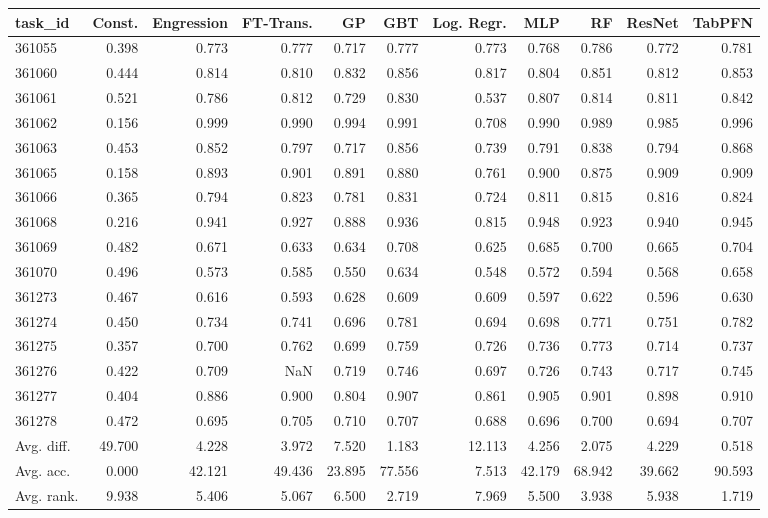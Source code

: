 \begin{tabular}{lrrrrrrrrrr}
\toprule
task\_id & Const. & Engression & FT-Trans. & GP & GBT & Log. Regr. & MLP & RF & ResNet & TabPFN \\
\midrule
361055 & 0.398 & 0.773 & 0.777 & 0.717 & 0.777 & 0.773 & 0.768 & 0.786 & 0.772 & 0.781 \\
361060 & 0.444 & 0.814 & 0.810 & 0.832 & 0.856 & 0.817 & 0.804 & 0.851 & 0.812 & 0.853 \\
361061 & 0.521 & 0.786 & 0.812 & 0.729 & 0.830 & 0.537 & 0.807 & 0.814 & 0.811 & 0.842 \\
361062 & 0.156 & 0.999 & 0.990 & 0.994 & 0.991 & 0.708 & 0.990 & 0.989 & 0.985 & 0.996 \\
361063 & 0.453 & 0.852 & 0.797 & 0.717 & 0.856 & 0.739 & 0.791 & 0.838 & 0.794 & 0.868 \\
361065 & 0.158 & 0.893 & 0.901 & 0.891 & 0.880 & 0.761 & 0.900 & 0.875 & 0.909 & 0.909 \\
361066 & 0.365 & 0.794 & 0.823 & 0.781 & 0.831 & 0.724 & 0.811 & 0.815 & 0.816 & 0.824 \\
361068 & 0.216 & 0.941 & 0.927 & 0.888 & 0.936 & 0.815 & 0.948 & 0.923 & 0.940 & 0.945 \\
361069 & 0.482 & 0.671 & 0.633 & 0.634 & 0.708 & 0.625 & 0.685 & 0.700 & 0.665 & 0.704 \\
361070 & 0.496 & 0.573 & 0.585 & 0.550 & 0.634 & 0.548 & 0.572 & 0.594 & 0.568 & 0.658 \\
361273 & 0.467 & 0.616 & 0.593 & 0.628 & 0.609 & 0.609 & 0.597 & 0.622 & 0.596 & 0.630 \\
361274 & 0.450 & 0.734 & 0.741 & 0.696 & 0.781 & 0.694 & 0.698 & 0.771 & 0.751 & 0.782 \\
361275 & 0.357 & 0.700 & 0.762 & 0.699 & 0.759 & 0.726 & 0.736 & 0.773 & 0.714 & 0.737 \\
361276 & 0.422 & 0.709 & NaN & 0.719 & 0.746 & 0.697 & 0.726 & 0.743 & 0.717 & 0.745 \\
361277 & 0.404 & 0.886 & 0.900 & 0.804 & 0.907 & 0.861 & 0.905 & 0.901 & 0.898 & 0.910 \\
361278 & 0.472 & 0.695 & 0.705 & 0.710 & 0.707 & 0.688 & 0.696 & 0.700 & 0.694 & 0.707 \\
Avg. diff. & 49.700 & 4.228 & 3.972 & 7.520 & 1.183 & 12.113 & 4.256 & 2.075 & 4.229 & 0.518 \\
Avg. acc. & 0.000 & 42.121 & 49.436 & 23.895 & 77.556 & 7.513 & 42.179 & 68.942 & 39.662 & 90.593 \\
Avg. rank. & 9.938 & 5.406 & 5.067 & 6.500 & 2.719 & 7.969 & 5.500 & 3.938 & 5.938 & 1.719 \\
\bottomrule
\end{tabular}
